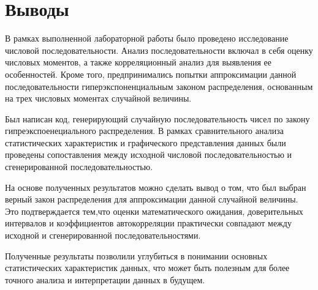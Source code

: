 \documentclass[14pt]{article}
\newcommand\mysection[1]{%
	  \addcontentsline{toc}{section}{#1}%
	  \section*{#1}%
}
\begin{document}
\mysection{Выводы}
	В рамках выполненной лабораторной работы было проведено исследование числовой последовательности. Анализ последовательности включал в себя оценку числовых моментов, а также корреляционный анализ для выявления ее особенностей. Кроме того, предпринимались попытки аппроксимации данной последовательности гиперэкспоненциальным законом распределения, основанным на трех числовых моментах случайной величины.

	Был написан код, генерирующий случайную последовательность чисел по закону гипреэкспоенециального распределения. В рамках сравнительного анализа статистических характеристик и графического представления данных были проведены сопоставления между исходной числовой последовательностью и сгенерированной последовательностью.

	На основе полученных результатов можно сделать вывод о том, что был выбран верный закон распределения для аппроксимации данной случайной величины. Это подтверждается тем,что оценки математического ожидания, доверительных интервалов и коэффициентов автокорреляции практически совпадают между исходной и сгенерированной последовательностями.

	Полученные результаты позволили углубиться в понимании основных статистических характеристик данных, что может быть полезным для более точного анализа и интерпретации данных в будущем.
\end{document}
